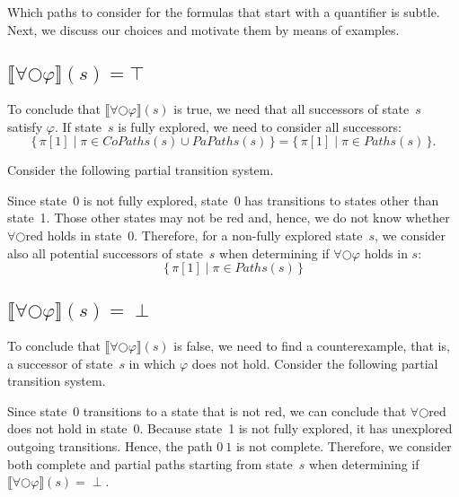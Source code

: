 \documentclass[12pt]{article}
\newcommand{\nxt}{\bigcirc}
\theoremstyle{definition}
\newcommand{\satisfaction}[1]{\llbracket #1 \rrbracket}
\newenvironment{franck}{\color{red}}{\color{black}}
\begin{document}
\begin{franck}
Which paths to consider for the formulas that start with a quantifier is subtle.  Next, we discuss our choices and motivate them by means of examples.

\subsection*{$\satisfaction{\forall \nxt \varphi}(s) = \top$}

To conclude that $\satisfaction{\forall \nxt \varphi}(s)$ is true, we need that all successors of state~$s$ satisfy $\varphi$.  If state~$s$ is fully explored, we need to consider all successors:
\[
\{\, \pi[1] \mid \pi \in \mathit{CoPaths}(s) \cup \mathit{PaPaths}(s) \,\}
= \{\, \pi[1] \mid \pi \in \mathit{Paths}(s) \,\}.
\]

Consider the following partial transition system.
\begin{center}
\end{center}
Since state~0 is not fully explored, state~0 has transitions to states other than state~1.  Those other states may not be red and, hence, we do not know whether  $\forall \nxt \mbox{red}$ holds in state~0.  Therefore, for a non-fully explored state~$s$, we consider also all potential successors of state~$s$ when determining if $\forall \nxt \varphi$ holds in $s$:
\[
\{\, \pi[1] \mid \pi \in \mathit{Paths}(s) \,\}
\]

\subsection*{$\satisfaction{\forall \nxt \varphi}(s) = \perp$}

To conclude that $\satisfaction{\forall \nxt \varphi}(s)$ is false, we need to find a counterexample, that is, a successor of state~$s$ in which $\varphi$ does not hold.  Consider the following partial transition system.
\begin{center}
\end{center}
Since state~0 transitions to a state that is not red, we can conclude that $\forall \nxt \mbox{red}$ does not hold in state~0.  Because state~1 is not fully explored, it has unexplored outgoing transitions.  Hence, the path $0\ 1$ is not complete.  Therefore, we consider both complete and partial paths starting from state~$s$ when determining if $\satisfaction{\forall \nxt \varphi}(s) = \perp$.


\end{franck}
\end{document}
